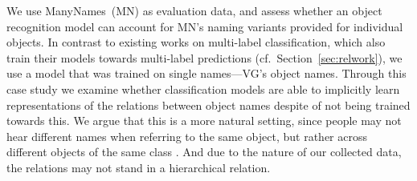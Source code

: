 %
We use ManyNames\ (MN) as evaluation data, and assess whether an object recognition model can account for MN's naming variants provided for individual objects.
In contrast to existing works on multi-label classification, which also train their models towards multi-label predictions 
(cf.\ Section\ \ref{sec:relwork}), we use a model that was trained on single names---VG's object names. %
Through this case study we examine whether classification models are able to implicitly learn representations of the relations between object names despite of not being trained towards this. 
We argue that this is a more natural setting, since people may not hear different names when referring to the same object, but rather across different objects of the same class . 
And due to the nature of our collected data, the relations may not stand in a hierarchical relation. 


